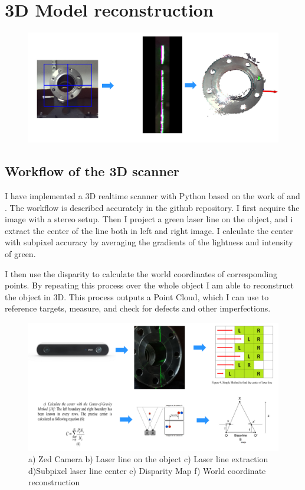 \documentclass[12pt,a4paper]{article}
\begin{document}
\section{3D Model reconstruction}

\begin{figure}[h!]
\centering
\includegraphics[width=\textwidth]{17.png}
\end{figure}

\subsection{Workflow of the 3D scanner}
I have implemented a 3D realtime scanner with Python based on the work of \cite{Binocular_3d_scanner} and \cite{ulrich_engineering_2019-1}. The workflow is described accurately in the github repository. I first acquire the image with a stereo setup. Then I project a green laser line on the object, and i extract the center of the line both in left and right image. I calculate the center with subpixel accuracy by averaging the gradients of the lightness and intensity of green. 

\clearpage
\newpage

I then use the disparity to calculate the world coordinates of corresponding points. By repeating this process over the whole object I am able to reconstruct the object in 3D. This process outputs a Point Cloud, which I can use to reference targets, measure, and check for defects and other imperfections.

\begin{figure}[h!]
\centering
\includegraphics[width=\textwidth]{16.png}
\caption{a) Zed Camera b) Laser line on the object c) Laser line extraction d)Subpixel laser line center e) Disparity Map f) World coordinate reconstruction}
\end{figure}
\end{document}
